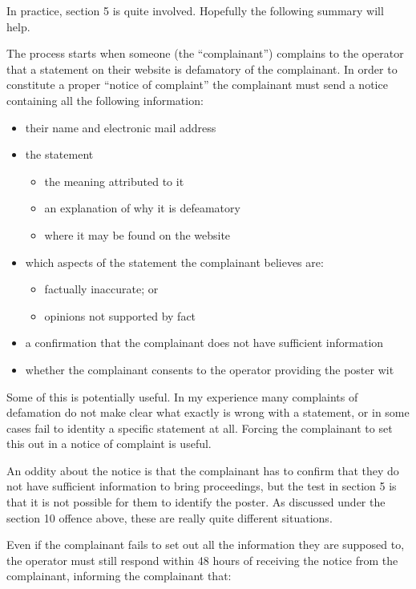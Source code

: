 \documentclass[]{article}
\begin{document}
In practice, section 5 is quite involved. Hopefully the following summary will help.

The process starts when someone (the ``complainant'') complains to the operator that a statement on their website is defamatory of the complainant. In order to constitute a proper ``notice of complaint'' the complainant must send a notice containing all the following information:

\begin{itemize}
\item their name and electronic mail address
\item the statement
  \begin{itemize}
  \item the meaning attributed to it
  \item an explanation of why it is defeamatory
  \item where it may be found on the website
  \end{itemize}
\item which aspects of the statement the complainant believes are:
  \begin{itemize}
  \item factually inaccurate; or
  \item opinions not supported by fact
  \end{itemize}
\item a confirmation that the complainant does not have sufficient information
\item whether the complainant consents to the operator providing the poster wit
\end{itemize}

Some of this is potentially useful. In my experience many complaints of defamation do not make clear what exactly is wrong with a statement, or in some cases fail to identity a specific statement at all. Forcing the complainant to set this out in a notice of complaint is useful.

An oddity about the notice is that the complainant has to confirm that they do not have sufficient information to bring proceedings, but the test in section 5 is that it is not possible for them to identify the poster. As discussed under the section 10 offence above, these are really quite different situations.

Even if the complainant fails to set out all the information they are supposed to, the operator must still respond within 48 hours of receiving the notice from the complainant, informing the complainant that:
\end{document}
